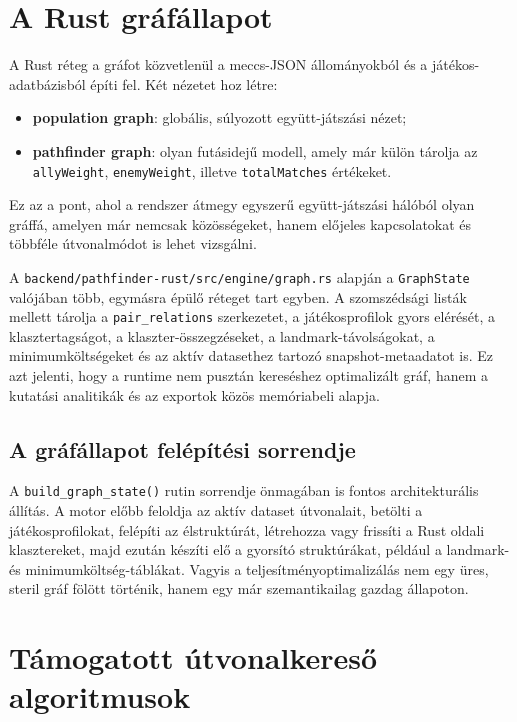 \documentclass[a4paper,12pt]{report}
\begin{document}
\section{A Rust gráfállapot}

A Rust réteg a gráfot közvetlenül a meccs-JSON állományokból és a játékos-adatbázisból építi fel. Két nézetet hoz létre:

\begin{itemize}
    \item \textbf{population graph}: globális, súlyozott együtt-játszási nézet;
    \item \textbf{pathfinder graph}: olyan futásidejű modell, amely már külön tárolja az \texttt{allyWeight}, \texttt{enemyWeight}, illetve \texttt{totalMatches} értékeket.
\end{itemize}

Ez az a pont, ahol a rendszer átmegy egyszerű együtt-játszási hálóból olyan gráffá, amelyen már nemcsak közösségeket, hanem előjeles kapcsolatokat és többféle útvonalmódot is lehet vizsgálni.

A \texttt{backend/pathfinder-rust/src/engine/graph.rs} alapján a \texttt{GraphState} valójában több, egymásra épülő réteget tart egyben. A szomszédsági listák mellett tárolja a \texttt{pair\_relations} szerkezetet, a játékosprofilok gyors elérését, a klasztertagságot, a klaszter-összegzéseket, a landmark-távolságokat, a minimumköltségeket és az aktív datasethez tartozó snapshot-metaadatot is. Ez azt jelenti, hogy a runtime nem pusztán kereséshez optimalizált gráf, hanem a kutatási analitikák és az exportok közös memóriabeli alapja.

\subsection{A gráfállapot felépítési sorrendje}

A \texttt{build\_graph\_state()} rutin sorrendje önmagában is fontos architekturális állítás. A motor előbb feloldja az aktív dataset útvonalait, betölti a játékosprofilokat, felépíti az élstruktúrát, létrehozza vagy frissíti a Rust oldali klasztereket, majd ezután készíti elő a gyorsító struktúrákat, például a landmark- és minimumköltség-táblákat. Vagyis a teljesítményoptimalizálás nem egy üres, steril gráf fölött történik, hanem egy már szemantikailag gazdag állapoton.

\section{Támogatott útvonalkereső algoritmusok}
\end{document}
